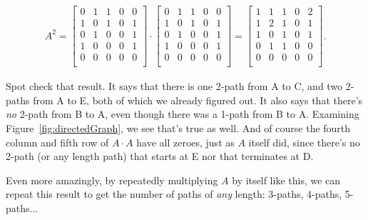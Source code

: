\vspace{-.15in}
\label{adjacencySquared}
\begin{align*}
A^2 =
\begin{bmatrix}
0 & 1 & 1 & 0 & 0 \\
1 & 0 & 1 & 0 & 1 \\
0 & 1 & 0 & 0 & 1 \\
1 & 0 & 0 & 0 & 1 \\
0 & 0 & 0 & 0 & 0 \\
\end{bmatrix} \cdot
\begin{bmatrix}
0 & 1 & 1 & 0 & 0 \\
1 & 0 & 1 & 0 & 1 \\
0 & 1 & 0 & 0 & 1 \\
1 & 0 & 0 & 0 & 1 \\
0 & 0 & 0 & 0 & 0 \\
\end{bmatrix} =
\begin{bmatrix}
1 & 1 & 1 & 0 & 2 \\
1 & 2 & 1 & 0 & 1 \\
1 & 0 & 1 & 0 & 1 \\
0 & 1 & 1 & 0 & 0 \\
0 & 0 & 0 & 0 & 0 \\
\end{bmatrix}.
\end{align*}
\vspace{-.15in}

Spot check that result. It says that there is one 2-path from A to C, and two
2-paths from A to E, both of which we already figured out. It also says that
there's \textit{no} 2-path from B to A, even though there was a 1-path from B
to A. Examining Figure~\ref{fig:directedGraph}, we see that's true as well. And
of course the fourth column and fifth row of $A\cdot A$ have all zeroes, just
as $A$ itself did, since there's no 2-path (or any length path) that starts at
E nor that terminates at D.

Even more amazingly, by repeatedly multiplying $A$ by itself like this, we can
repeat this result to get the number of paths of \textit{any} length: 3-paths,
4-paths, 5-paths...

